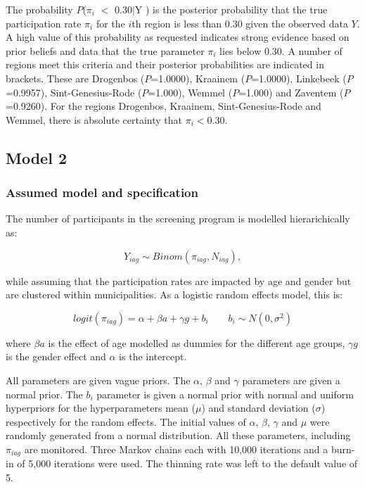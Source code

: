\documentclass[12pt]{article}
\begin{document}
The probability $P$($\pi_i$ $<$ 0.30$|$Y ) is the posterior probability that the true participation rate $\pi_i$ for the $i$th region is less than 0.30 given the observed data $Y$. A high value of this probability as requested indicates strong evidence based on prior beliefs and data that the true parameter $\pi_i$ lies below 0.30. A number of regions meet this criteria and their posterior probabilities are indicated in brackets. These are Drogenbos ($P$=1.0000), Kraainem ($P$=1.0000), Linkebeek ($P$=0.9957), Sint-Genesius-Rode ($P$=1.000), Wemmel ($P$=1.000) and Zaventem ($P$=0.9260). For the regions Drogenbos, Kraainem, Sint-Genesius-Rode and Wemmel, there is absolute certainty that $\pi_i <$0.30.

\newpage

\subsection{Model 2}

\subsubsection{Assumed model and specification}

The number of participants in the screening program is modelled hierarichically as:

\[
    Y_{iag} \sim Binom(\pi_{iag}, N_{iag}),
\]

while assuming that the participation rates are impacted by age and gender but are clustered within municipalities. As a logistic random effects model, this is: 

\[
    logit(\pi_{iag}) = \alpha + \beta a + \gamma g + b_i \qquad b_i \sim N(0, \sigma^2)
\]

\noindent where $\beta a$ is the effect of age modelled as dummies for the different age groups, $\gamma g$ is the gender effect and $\alpha$ is the intercept. 

All parameters are given vague priors. The $\alpha$, $\beta$ and $\gamma$ parameters are given a normal prior. The $b_i$ parameter is given a normal prior with normal and uniform hyperpriors for the hyperparameters mean ($\mu$) and standard deviation ($\sigma$) respectively for the random effects. The initial values of $\alpha$, $\beta$, $\gamma$ and $\mu$ were randomly generated from a normal distribution. All these parameters, including $\pi_{iag}$ are monitored. Three Markov chains each with 10,000 iterations and a burn-in of 5,000 iterations were used. The thinning rate was left to the default value of 5. 
\end{document}
